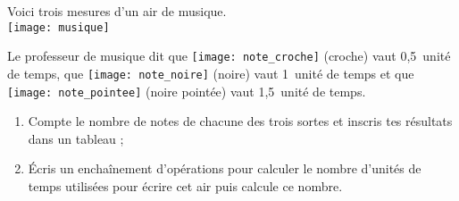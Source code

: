 \begin{exercice}[Alouette]
Voici trois mesures d'un air de musique.\\[1em]
\texttt{[image: musique]}

Le professeur de musique dit que \texttt{[image: note\_croche]} (croche) vaut 0,5 unité de temps, que \texttt{[image: note\_noire]} (noire) vaut 1 unité de temps et que \texttt{[image: note\_pointee]} (noire pointée) vaut 1,5 unité de temps.

\begin{enumerate}
 \item Compte le nombre de notes de chacune des trois sortes et inscris tes résultats dans un tableau ;
 \item Écris un enchaînement d'opérations pour calculer le nombre d'unités de temps utilisées pour écrire cet air puis calcule ce nombre.
 \end{enumerate}

\end{exercice}


